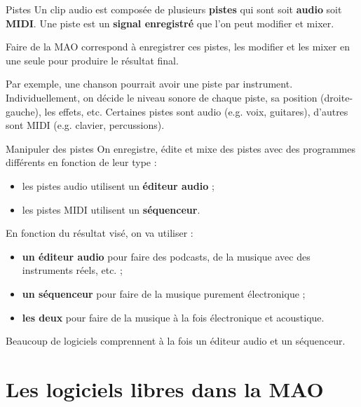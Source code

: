 \documentclass{beamer}
\begin{document}
\begin{frame}{Pistes}
  Un clip audio est composée de plusieurs \textbf{pistes} qui sont soit \textbf{audio} soit \textbf{MIDI}. Une piste est un \textbf{signal enregistré} que l'on peut modifier et mixer.
  \medskip
  
  Faire de la MAO correspond à enregistrer ces pistes, les modifier et les mixer en une seule pour produire le résultat final.
  \medskip
  
  Par exemple, une chanson pourrait avoir une piste par instrument. Individuellement, on décide le niveau sonore de chaque piste, sa position (droite-gauche), les effets, etc. Certaines pistes sont audio (e.g. voix, guitares), d'autres sont MIDI (e.g. clavier, percussions).
\end{frame}

\begin{frame}{Manipuler des pistes}
  On enregistre, édite et mixe des pistes avec des programmes différents en fonction de leur type :
  \begin{itemize}
  \item les pistes audio utilisent un \textbf{éditeur audio} ;
  \item les pistes MIDI utilisent un \textbf{séquenceur}.
  \end{itemize}
  
  En fonction du résultat visé, on va utiliser :
  \begin{itemize}
  \item \textbf{un éditeur audio} pour faire des podcasts, de la musique avec des instruments réels, etc. ;
  \item \textbf{un séquenceur} pour faire de la musique purement électronique ;
  \item \textbf{les deux} pour faire de la musique à la fois électronique et acoustique.
  \end{itemize}
  Beaucoup de logiciels comprennent à la fois un éditeur audio et un séquenceur.
\end{frame}




\section{Les logiciels libres dans la MAO}
\end{document}
